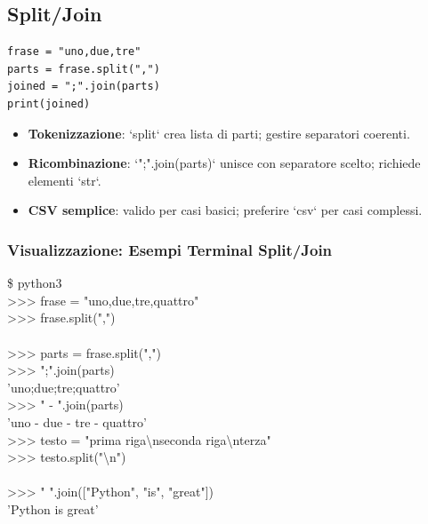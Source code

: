 \subsection{Split/Join}
\begin{lstlisting}
frase = "uno,due,tre"
parts = frase.split(",")
joined = ";".join(parts)
print(joined)
\end{lstlisting}
\begin{tcolorbox}[title=Spiegazione del codice]
\begin{itemize}
  \item \textbf{Tokenizzazione}: `split` crea lista di parti; gestire separatori coerenti.
  \item \textbf{Ricombinazione}: `";".join(parts)` unisce con separatore scelto; richiede elementi `str`.
  \item \textbf{CSV semplice}: valido per casi basici; preferire `csv` per casi complessi.
\end{itemize}
\end{tcolorbox}

\subsubsection{Visualizzazione: Esempi Terminal Split/Join}
\begin{center}
\begin{tcolorbox}[title={Esempi Terminal: Split e Join}, colback=black!5, colframe=blue!60, width=0.95\textwidth, fontupper=\ttfamily\small]
\textcolor{green!60!black}{\$ python3}\\
\textcolor{blue!80}{>>> frase = "uno,due,tre,quattro"}\\
\textcolor{blue!80}{>>> frase.split(",")}\\
['uno', 'due', 'tre', 'quattro']\\[4pt]
\textcolor{blue!80}{>>> parts = frase.split(",")}\\
\textcolor{blue!80}{>>> ";".join(parts)}\\
'uno;due;tre;quattro'\\[4pt]
\textcolor{blue!80}{>>> " - ".join(parts)}\\
'uno - due - tre - quattro'\\[4pt]
\textcolor{blue!80}{>>> testo = "prima riga\textbackslash nseconda riga\textbackslash nterza"}\\
\textcolor{blue!80}{>>> testo.split("\textbackslash n")}\\
['prima riga', 'seconda riga', 'terza']\\[4pt]
\textcolor{blue!80}{>>> " ".join(["Python", "is", "great"])}\\
'Python is great'
\end{tcolorbox}
\end{center}

